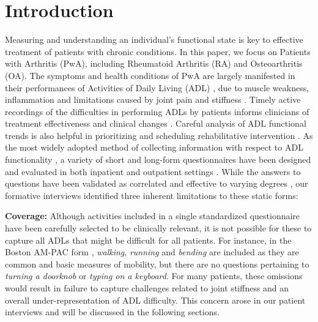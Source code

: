 \documentclass{sig-alternate-05-2015}
\begin{document}
\vspace{-3mm}
\vspace{-3mm}
\section{Introduction}
Measuring and understanding an individual's functional state is key to effective treatment of patients with chronic conditions\cite{matsumura1983determination, stewart1989functional}. In this paper, we focus on Patients with Arthritis (PwA), including Rheumatoid Arthritis (RA) and Osteoarthritis (OA). The symptoms and health conditions of PwA are largely manifested in their performances of Activities of Daily Living (ADL) \cite{self1969assessment}, due to muscle weakness, inflammation and limitations caused by joint pain and stiffness \cite{archenholtz2008validity, katz1995impact}. Timely active recordings of the difficulties in performing ADLs by patients informs clinicians of treatment effectiveness and clinical changes \cite{katz1983assessing}. Careful analysis of ADL functional trends is also helpful in prioritizing and scheduling rehabilitative intervention \cite{legg2006occupational}. As the most widely adopted method of collecting information with respect to ADL functionality \cite{katz1983assessing}, a variety of short and long-form questionnaires have been designed and evaluated in both inpatient and outpatient settings \cite{ciro2015instrumental, promis2012patient}. While the answers to questions have been validated as correlated and effective to varying degrees \cite{archenholtz2008validity}, our formative interviews identified three inherent limitations to these static forms:

\textbf{Coverage:} Although activities included in a single standardized questionnaire have been carefully selected to be clinically relevant, it is not possible for these to capture all ADLs that might be difficult for all patients. For instance, in the Boston AM-PAC form \cite{haley2004short}, \textit{walking}, \textit{running} and \textit{bending} are included as they are common and basic measures of mobility, but there are no questions pertaining to \textit{turning a doorknob} or \textit{typing on a keyboard}. For many patients, these omissions would result in failure to capture challenges related to joint stiffness and an overall under-representation of ADL difficulty. This concern arose in our patient interviews and will be discussed in the following sections. 
\end{document}
